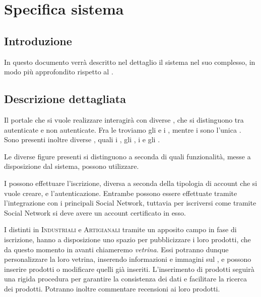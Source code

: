 \chapter{Specifica sistema} 
\label{cha:specifica_sistema}

\section{Introduzione} 
In questo documento verrà descritto nel dettaglio il sistema nel suo complesso, in modo più approfondito rispetto al .

\section{Descrizione dettagliata} 
\label{sec:descrizione_dettagliata}
Il portale che si vuole realizzare interagirà con diverse , che si distinguono tra autenticate e non autenticate. Fra le  troviamo gli  e i , mentre i  sono l'unica .
Sono presenti inoltre diverse , quali i , gli , i  e gli .

\bigskip
\noindent
Le diverse figure presenti si distinguono a seconda di quali funzionalità, messe a disposizione dal sistema, possono utilizzare.

I  possono effettuare l'iscrizione, diversa a seconda della tipologia di account che si vuole creare, e l'autenticazione. Entrambe possono essere effettuate tramite l'integrazione con i principali Social Network, tuttavia per iscriversi come  tramite Social Network si deve avere un account certificato in esso.

I  distinti in \textsc{Industriali} e \textsc{Artigianali} tramite un apposito campo in fase di iscrizione, hanno a disposizione uno spazio per pubblicizzare i loro prodotti, che da questo momento in avanti chiameremo \emph{vetrina}. Essi potranno dunque personalizzare la loro vetrina, inserendo informazioni e immagini sul , e possono inserire prodotti o modificare quelli già inseriti. L'inserimento di prodotti seguirà una rigida procedura per garantire la consistenza dei dati e facilitare la ricerca dei prodotti. Potranno inoltre commentare recensioni ai loro prodotti.

